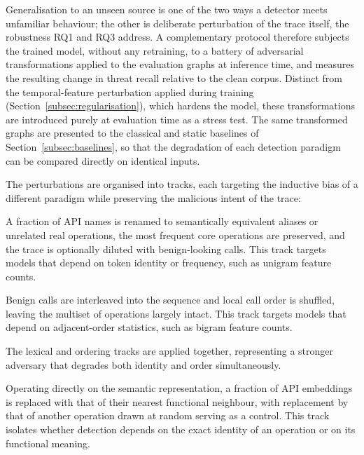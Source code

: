 \documentclass[%
    BCOR=10mm,
    DIV=13,
    toc=bibliography,
    toc=listof,
    oneside,
    12pt,
]{scrbook}
\begin{document}
Generalisation to an unseen source is one of the two ways a detector meets
unfamiliar behaviour; the other is deliberate perturbation of the trace itself,
the robustness RQ1 and RQ3 address. A complementary protocol therefore subjects
the trained model, without any retraining, to a battery of adversarial
transformations applied to the evaluation graphs at inference time, and
measures the resulting change in threat recall relative to the clean corpus.
Distinct from the temporal-feature
perturbation applied during training (Section~\ref{subsec:regularisation}), which hardens the
model, these transformations are introduced purely at evaluation time as a
stress test. The same transformed graphs are presented to the classical and
static baselines of Section~\ref{subsec:baselines}, so that the degradation of
each detection paradigm can be compared directly on identical inputs.

The perturbations are organised into tracks, each targeting the inductive bias
of a different paradigm while preserving the malicious intent of the trace:

\begin{description}[leftmargin=0pt, labelwidth=0pt, labelsep=\parskip, style=nextline]

\item[\textbf{Lexical substitution.}] A fraction of API names is renamed to
semantically equivalent aliases or unrelated real operations, the most
frequent core operations are preserved, and the trace is optionally diluted with
benign-looking calls. This track targets models that depend on token identity or
frequency, such as unigram feature counts.

\item[\textbf{Ordering perturbation.}] Benign calls are interleaved into the
sequence and local call order is shuffled, leaving the multiset of operations
largely intact. This track targets models that depend on adjacent-order
statistics, such as bigram feature counts.

\item[\textbf{Combined perturbation.}] The lexical and ordering tracks are
applied together, representing a stronger adversary that degrades both identity
and order simultaneously.

\item[\textbf{Semantic-vector substitution.}] Operating directly on the semantic
representation, a fraction of API embeddings is replaced with that of their
nearest functional neighbour, with replacement by that of another operation
drawn at random serving as a control. This track isolates whether detection
depends on the exact identity of an operation or on its functional meaning.

\end{description}
\end{document}
